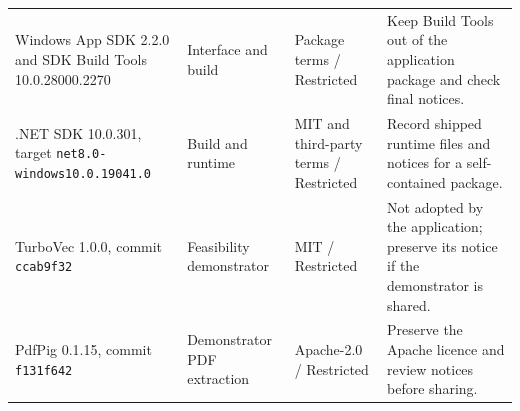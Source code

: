 \begin{longtable}{@{}P{0.29\dimexpr{}\tabcolsep\relax}P{0.18\dimexpr{}\tabcolsep\relax}P{0.18\dimexpr{}\tabcolsep\relax}P{0.35\dimexpr{}\tabcolsep\relax}@{}}
    Windows App SDK 2.2.0 and SDK Build Tools 10.0.28000.2270 &
    Interface and build & Package terms / Restricted &
    Keep Build Tools out of the application package and check final notices. \\

    .NET SDK 10.0.301, target \texttt{net8.0-windows10.0.19041.0} &
    Build and runtime & MIT and third-party terms / Restricted &
    Record shipped runtime files and notices for a self-contained package. \\

    TurboVec 1.0.0, commit \texttt{ccab9f32} &
    Feasibility demonstrator & MIT / Restricted & Not adopted by the application;
    preserve its notice if the demonstrator is shared. \\

    PdfPig 0.1.15, commit \texttt{f131f642} &
    Demonstrator PDF extraction & Apache-2.0 / Restricted &
    Preserve the Apache licence and review notices before sharing. \\
    \bottomrule
\end{longtable}
\endgroup
